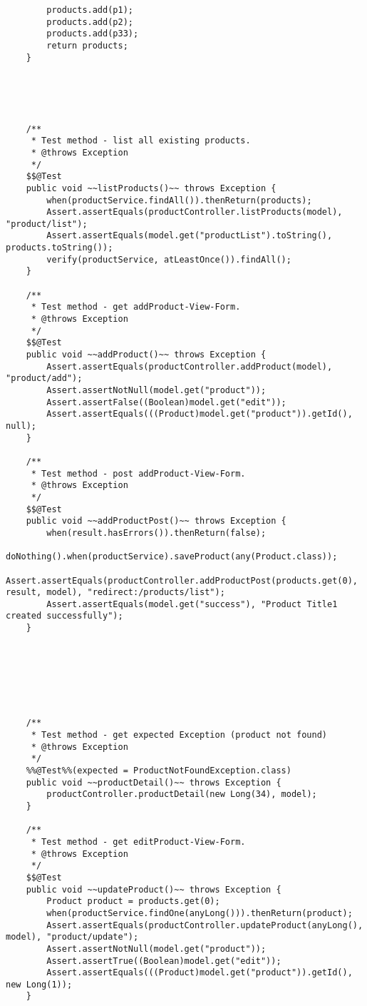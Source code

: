\documentclass[12pt]{article}
\begin{document}
\begin{lstlisting}
        products.add(p1);
        products.add(p2);
        products.add(p33);
        return products;
    }





    /**
     * Test method - list all existing products.
     * @throws Exception
     */
    $$@Test
    public void ~~listProducts()~~ throws Exception {
        when(productService.findAll()).thenReturn(products);
        Assert.assertEquals(productController.listProducts(model), "product/list");
        Assert.assertEquals(model.get("productList").toString(), products.toString());
        verify(productService, atLeastOnce()).findAll();
    }

    /**
     * Test method - get addProduct-View-Form.
     * @throws Exception
     */
    $$@Test
    public void ~~addProduct()~~ throws Exception {
        Assert.assertEquals(productController.addProduct(model), "product/add");
        Assert.assertNotNull(model.get("product"));
        Assert.assertFalse((Boolean)model.get("edit"));
        Assert.assertEquals(((Product)model.get("product")).getId(), null);
    }

    /**
     * Test method - post addProduct-View-Form.
     * @throws Exception
     */
    $$@Test
    public void ~~addProductPost()~~ throws Exception {
        when(result.hasErrors()).thenReturn(false);
        doNothing().when(productService).saveProduct(any(Product.class));
        Assert.assertEquals(productController.addProductPost(products.get(0), result, model), "redirect:/products/list");
        Assert.assertEquals(model.get("success"), "Product Title1 created successfully");
    }







    /**
     * Test method - get expected Exception (product not found)
     * @throws Exception
     */
    %%@Test%%(expected = ProductNotFoundException.class)
    public void ~~productDetail()~~ throws Exception {
        productController.productDetail(new Long(34), model);
    }

    /**
     * Test method - get editProduct-View-Form.
     * @throws Exception
     */
    $$@Test
    public void ~~updateProduct()~~ throws Exception {
        Product product = products.get(0);
        when(productService.findOne(anyLong())).thenReturn(product);
        Assert.assertEquals(productController.updateProduct(anyLong(), model), "product/update");
        Assert.assertNotNull(model.get("product"));
        Assert.assertTrue((Boolean)model.get("edit"));
        Assert.assertEquals(((Product)model.get("product")).getId(), new Long(1));
    }


\end{lstlisting}
\end{document}
